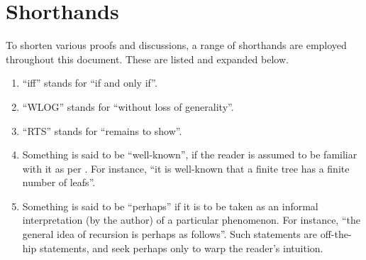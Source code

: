 \section{Shorthands} \label{sec:introduction:shorthands}

To shorten various proofs and discussions, a range of shorthands are employed
throughout this document. These are listed and expanded below.

\begin{enumerate}

\item ``iff'' stands for ``if and only if''. 

\item ``WLOG'' stands for ``without loss of generality''. 

\item ``RTS'' stands for ``remains to show''. 

\item Something is said to be ``well-known'', if the reader is assumed to be
familiar with it as per . For instance, ``it is
well-known that a finite tree has a finite number of leafs''. 

\item Something is said to be ``perhaps'' if it is to be taken as an informal
interpretation (by the author) of a particular phenomenon. For instance, ``the
general idea of recursion is perhaps as follows''. Such statements are
off-the-hip statements, and seek perhaps only to warp the reader's
intuition.

\end{enumerate}
